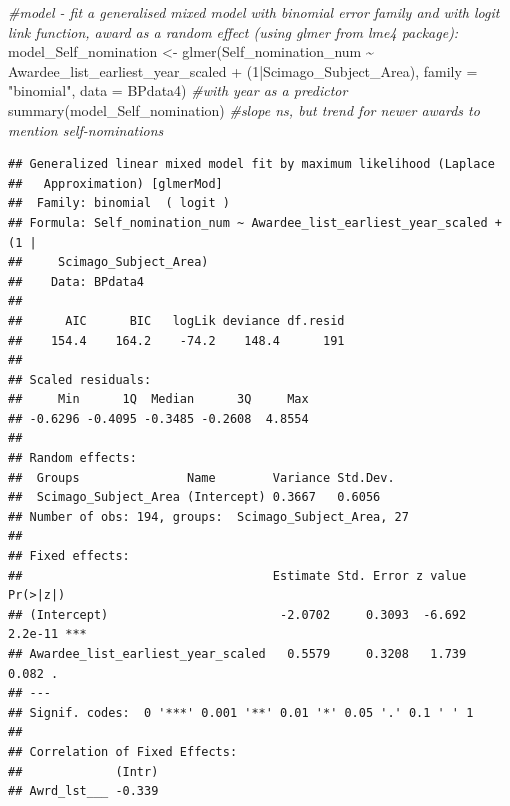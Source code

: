 \documentclass[
]{article}
\newenvironment{Shaded}{\begin{snugshade}}{\end{snugshade}}
\newcommand{\AttributeTok}[1]{\textcolor[rgb]{0.77,0.63,0.00}{#1}}
\newcommand{\CommentTok}[1]{\textcolor[rgb]{0.56,0.35,0.01}{\textit{#1}}}
\newcommand{\DecValTok}[1]{\textcolor[rgb]{0.00,0.00,0.81}{#1}}
\newcommand{\DocumentationTok}[1]{\textcolor[rgb]{0.56,0.35,0.01}{\textbf{\textit{#1}}}}
\newcommand{\FunctionTok}[1]{\textcolor[rgb]{0.00,0.00,0.00}{#1}}
\newcommand{\NormalTok}[1]{#1}
\newcommand{\OtherTok}[1]{\textcolor[rgb]{0.56,0.35,0.01}{#1}}
\newcommand{\SpecialCharTok}[1]{\textcolor[rgb]{0.00,0.00,0.00}{#1}}
\newcommand{\StringTok}[1]{\textcolor[rgb]{0.31,0.60,0.02}{#1}}
\begin{document}
\begin{Shaded}
\begin{Highlighting}[]
\CommentTok{\#model {-} fit a generalised mixed model with binomial error family and with logit link function, award as a random effect (using glmer from lme4 package):}
\NormalTok{model\_Self\_nomination }\OtherTok{\textless{}{-}} \FunctionTok{glmer}\NormalTok{(Self\_nomination\_num }\SpecialCharTok{\textasciitilde{}}\NormalTok{ Awardee\_list\_earliest\_year\_scaled }\SpecialCharTok{+}\NormalTok{ (}\DecValTok{1}\SpecialCharTok{|}\NormalTok{Scimago\_Subject\_Area), }\AttributeTok{family =} \StringTok{"binomial"}\NormalTok{, }\AttributeTok{data =}\NormalTok{ BPdata4) }\CommentTok{\#with year as a predictor}
\FunctionTok{summary}\NormalTok{(model\_Self\_nomination) }\CommentTok{\#slope ns, but trend for newer awards to mention self{-}nominations}
\end{Highlighting}
\end{Shaded}

\begin{verbatim}
## Generalized linear mixed model fit by maximum likelihood (Laplace
##   Approximation) [glmerMod]
##  Family: binomial  ( logit )
## Formula: Self_nomination_num ~ Awardee_list_earliest_year_scaled + (1 |  
##     Scimago_Subject_Area)
##    Data: BPdata4
## 
##      AIC      BIC   logLik deviance df.resid 
##    154.4    164.2    -74.2    148.4      191 
## 
## Scaled residuals: 
##     Min      1Q  Median      3Q     Max 
## -0.6296 -0.4095 -0.3485 -0.2608  4.8554 
## 
## Random effects:
##  Groups               Name        Variance Std.Dev.
##  Scimago_Subject_Area (Intercept) 0.3667   0.6056  
## Number of obs: 194, groups:  Scimago_Subject_Area, 27
## 
## Fixed effects:
##                                   Estimate Std. Error z value Pr(>|z|)    
## (Intercept)                        -2.0702     0.3093  -6.692  2.2e-11 ***
## Awardee_list_earliest_year_scaled   0.5579     0.3208   1.739    0.082 .  
## ---
## Signif. codes:  0 '***' 0.001 '**' 0.01 '*' 0.05 '.' 0.1 ' ' 1
## 
## Correlation of Fixed Effects:
##             (Intr)
## Awrd_lst___ -0.339
\end{verbatim}

\begin{Shaded}
\end{Shaded}
\end{document}
